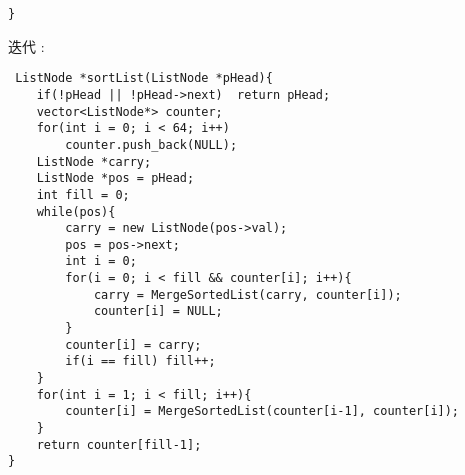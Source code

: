 \begin{description}
\begin{lstlisting}
}
		\end{lstlisting}
	\item{迭代} : \\
		\begin{lstlisting}
 ListNode *sortList(ListNode *pHead){
    if(!pHead || !pHead->next)  return pHead;
    vector<ListNode*> counter;
    for(int i = 0; i < 64; i++)
        counter.push_back(NULL);
    ListNode *carry;
    ListNode *pos = pHead;
    int fill = 0;
    while(pos){
        carry = new ListNode(pos->val);
        pos = pos->next;
        int i = 0;
        for(i = 0; i < fill && counter[i]; i++){
            carry = MergeSortedList(carry, counter[i]);
            counter[i] = NULL;
        }
        counter[i] = carry;
        if(i == fill) fill++;
    }
    for(int i = 1; i < fill; i++){
        counter[i] = MergeSortedList(counter[i-1], counter[i]);
    }
    return counter[fill-1];
}
		\end{lstlisting}
\end{description}

